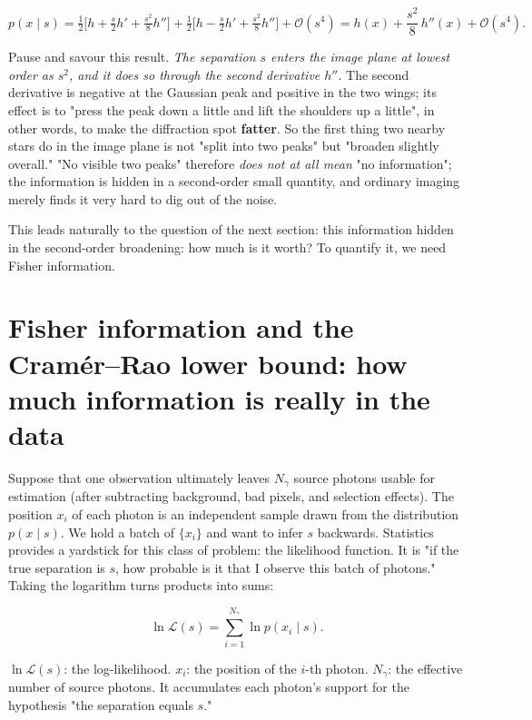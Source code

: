 \[
  p(x\mid s)
  =\tfrac12\Big[h+\tfrac{s}{2}h'+\tfrac{s^{2}}{8}h''\Big]
  +\tfrac12\Big[h-\tfrac{s}{2}h'+\tfrac{s^{2}}{8}h''\Big]
  +\mathcal{O}(s^{4})
  =h(x)+\frac{s^{2}}{8}\,h''(x)+\mathcal{O}(s^{4}).
\]

Pause and savour this result. \emph{The separation $s$ enters the image plane at lowest order as $s^2$, and it does so through the second derivative $h''$}. The second derivative is negative at the Gaussian peak and positive in the two wings; its effect is to "press the peak down a little and lift the shoulders up a little", in other words, to make the diffraction spot \textbf{fatter}. So the first thing two nearby stars do in the image plane is not "split into two peaks" but "broaden slightly overall." "No visible two peaks" therefore \emph{does not at all mean} "no information"; the information is hidden in a second-order small quantity, and ordinary imaging merely finds it very hard to dig out of the noise.

This leads naturally to the question of the next section: this information hidden in the second-order broadening: how much is it worth? To quantify it, we need Fisher information.


\section{Fisher information and the Cramér--Rao lower bound: how much information is really in the data}
\label{sec:e12-fisher}

Suppose that one observation ultimately leaves $N_\gamma$ source photons usable for estimation (after subtracting background, bad pixels, and selection effects). The position $x_i$ of each photon is an independent sample drawn from the distribution $p(x\mid s)$. We hold a batch of $\{x_i\}$ and want to infer $s$ backwards. Statistics provides a yardstick for this class of problem: the likelihood function. It is "if the true separation is $s$, how probable is it that I observe this batch of photons." Taking the logarithm turns products into sums:

\begin{equation}
  \ln\mathcal{L}(s)=\sum_{i=1}^{N_\gamma}\ln p(x_i\mid s).
  \label{eq:e12-loglike}
\end{equation}
\begin{formulaexplain}
$\ln\mathcal{L}(s)$: the log-likelihood. $x_i$: the position of the $i$-th photon. $N_\gamma$: the effective number of source photons. It accumulates each photon's support for the hypothesis "the separation equals $s$."
\end{formulaexplain}

